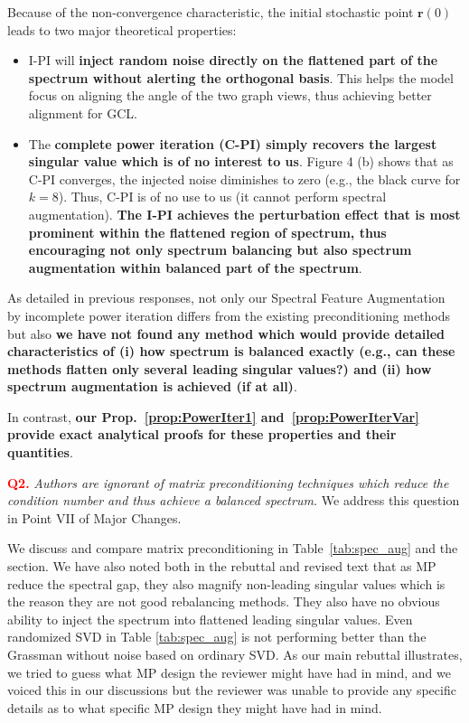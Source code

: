 Because of the non-convergence characteristic, the initial stochastic point $\mathbf{r}(0)$ leads to two major theoretical properties:
\begin{itemize}
    \item I-PI will \textbf{inject random noise directly on the flattened part of the spectrum without alerting the orthogonal basis}. This helps the model focus on aligning the angle of the two graph views, thus achieving better alignment for GCL.
    
    \item The \textbf{complete power iteration (C-PI) simply recovers the largest singular value which is of no interest to us}. Figure 4 (b) shows that as C-PI converges, the injected noise diminishes to zero (e.g., the black curve for $k=8$). Thus, C-PI is of no use to us (it cannot perform spectral augmentation). \textbf{The I-PI achieves the perturbation effect that is most prominent within the flattened region of spectrum, thus encouraging not only spectrum balancing but also spectrum augmentation within balanced part of the spectrum}.
\end{itemize}

As detailed in previous responses, not only our Spectral Feature Augmentation by incomplete power iteration differs from the existing preconditioning methods but also \textbf{we have not found any method which would provide detailed characteristics of (i) how spectrum is balanced exactly (e.g., can these methods flatten only several leading singular values?) and (ii) how spectrum augmentation is achieved (if at all)}.

In contrast, \textbf{our Prop.~\ref{prop:PowerIter1} and~\ref{prop:PowerIterVar} provide exact analytical proofs for these properties and their quantities}.

\vspace{0.1cm}
\noindent\vspace{0.1cm} \noindent\textcolor{red}{\textcolor{red}{\bf Q2. }} {\em Authors are ignorant of matrix preconditioning techniques which reduce the condition number and thus achieve a balanced spectrum. }
We address this question in {\color{blue}Point VII} of {\color{blue}Major Changes}. 

We discuss and compare matrix preconditioning in Table~\ref{tab:spec_aug} and the  section. We have also noted both in the rebuttal and revised text that as MP reduce the spectral gap, they also magnify non-leading singular values which is the reason they are not good rebalancing methods. They also have no obvious ability to inject the spectrum into flattened leading singular values. Even randomized SVD in Table \ref{tab:spec_aug} is not performing better than the Grassman without noise based on ordinary SVD. As our main rebuttal illustrates, we tried to guess what MP design the reviewer might have had in mind, and we voiced this in our discussions but the reviewer was unable to provide any specific details as to what specific MP design they might have had in mind.

